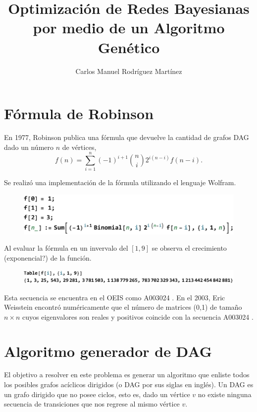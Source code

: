 \documentclass[10pt,a4paper]{article}
\author{Carlos Manuel Rodríguez Martínez}
\title{Optimización de Redes Bayesianas por medio de un Algoritmo Genético}
\begin{document}
\maketitle

\section{Fórmula de Robinson}
En 1977, Robinson \cite{Robinson1977} publica una fórmula que devuelve la cantidad de grafos DAG dado un número $n$ de vértices,
\[
	f(n) = \sum_{i=1}^n (-1)^{i+1} \binom{n}{i} 2^{i(n-i)} f(n-i).
\]

Se realizó una implementación de la fórmula utilizando el lenguaje Wolfram.
\begin{figure}[h!]
\includegraphics[scale=0.6]{img/formula}
\end{figure}

Al evaluar la fórmula en un invervalo del $[1,9]$ se observa el crecimiento (exponencial?) de la función.
\begin{figure}[h!]
\includegraphics[scale=0.6]{img/formulaEval}
\end{figure}

Esta secuencia se encuentra en el OEIS como A003024 \cite{oeis}. En el 2003, Eric Weisstein encontró numéricamente que el número de matrices (0,1) de tamaño $n \times n$ cuyos eigenvalores son reales y positivos coincide con la secuencia A003024 \cite{weisstein}.

\section{Algoritmo generador de DAG}
El objetivo a resolver en este problema es generar un algoritmo que enliste todos los posibles grafos acíclicos dirigidos (o DAG por sus siglas en inglés). Un DAG es un grafo dirigido que no posee ciclos, esto es, dado un vértice $v$ no existe ninguna secuencia de transiciones que nos regrese al mismo vértice $v$.
\end{document}
